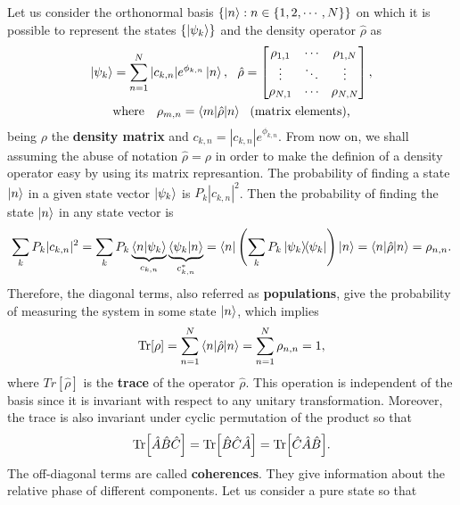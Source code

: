 Let us consider the orthonormal basis $ \{\ket{n} : n \in \{1, 2, \cdots, N\}\} $ on which it is possible to represent the states $ \{\ket{\psi_k}\} $ and the density operator $ \hat{\rho} $ as
\begin{gather}
	\ket{\psi_k} = \sum_{n = 1}^{N} |c_{k,n}|e^{\phi_{k,n}} \ket{n},\ \ 
	\hat{\rho} = \left[ 
	\begin{matrix}
		\rho_{1,1} & \cdots & \rho_{1,N} \\
		\vdots & \ddots & \vdots \\
		\rho_{N,1} & \cdots & \rho_{N,N}
	\end{matrix} \right], \\
	\textrm{where}\ \ \ \rho_{m,n} = \braket{m|\hat{\rho}|n}\ \ \textrm{(matrix elements),}
\end{gather}
being $ \rho $ the \textbf{density matrix} and $ c_{k,n} = |c_{k,n}|e^{\phi_{k,n}} $. From now on, we shall assuming the abuse of notation $ \hat{\rho} = \rho $ in order to make the definion of a density operator easy by using its matrix represantion. The probability of finding a state $ \ket{n} $ in a given state vector $ \ket{\psi_k} $ is $ P_k |c_{k,n}|^2 $. Then the probability of finding the state $ \ket{n} $ in any state vector is
\begin{equation}
	\sum_{k} P_k |c_{k,n}|^2 = \sum_{k} P_k \underbrace{\braket{n|\psi_k}}_{c_{k,n}}\underbrace{\braket{\psi_k|n}}_{c_{k,n}^*} = \bra{n} \left( \sum_k P_k \ketbra{\psi_k}{\psi_k} \right) \ket{n} = \braket{n|\hat{\rho}|n} = \rho_{n,n}.
\end{equation}
Therefore, the diagonal terms, also referred as \textbf{populations}, give the probability of measuring the system in some state $ \ket{n} $, which implies
\begin{equation}
	\Tr[\rho] = \sum_{n = 1}^{N} \braket{n|\hat{\rho}|n} = \sum_{n = 1}^{N} \rho_{n,n} = 1,
\end{equation} 
where $ Tr[\hat{\rho}] $ is the \textbf{trace} of the operator $ \hat{\rho} $. This operation is independent of the basis since it is invariant with respect to any unitary transformation. Moreover, the trace is also invariant under cyclic permutation of the product so that
\begin{equation}
	\Tr[\hat{A}\hat{B}\hat{C}] = \Tr[\hat{B}\hat{C}\hat{A}] = \Tr[\hat{C}\hat{A}\hat{B}].
\end{equation}
The off-diagonal terms are called \textbf{coherences}. They give information about the relative phase of different components. Let us consider a pure state so that
